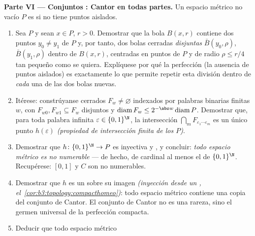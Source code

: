\begin{problem}
\medskip
\noindent\textbf{Parte VI --- Conjuntos
: Cantor en todas partes.} Un
espacio métrico  no vacío $P$
es \emph{} si no tiene puntos
aislados.
\begin{enumerate}[resume]
  \item Sea $P$ 
   y sean $x \in P$, $r > 0$.
  Demostrar que la bola $B(x, r)$ contiene dos puntos $y_0
        \neq y_1$ de $P$ y, por tanto, dos bolas cerradas
  \emph{disjuntas} $\bar B(y_0, \rho)$, $\bar B(y_1, \rho)$ dentro de
  $B(x, r)$, centradas en puntos de $P$ y de radio $\rho
        \leq r/4$ tan pequeño como se quiera. Explíquese por qué la
  perfección (la ausencia de puntos aislados) es exactamente lo que
  permite repetir esta división dentro de \emph{cada} una de las dos
  bolas nuevas. \item Itérese: constrúyanse cerrados
  $F_w \neq \varnothing$ indexados por palabras binarias finitas $w$,
  con $F_{w0},
        F_{w1} \subseteq F_w$ disjuntos y
  $\operatorname{diam}F_w \leq 2^{-\abs w}
        \operatorname{diam}P$. Demostrar que, para toda palabra infinita
  $\varepsilon \in \{0,1\}^\N$, la intersección
  $\bigcap_mF_{\varepsilon_1\cdots\varepsilon_m}$ es un único punto
  $h(\varepsilon)$ \emph{(propiedad de intersección finita de los
   $P$)}. \item Demostrar que
  $h\colon\{0,1\}^\N \to P$ es inyectiva y
  , y concluir: \emph{todo
  espacio métrico 
   es no numerable} --- de
  hecho, de cardinal al menos el de $\{0,1\}^\N$. Recupérese: $[0,1]$ y
  $C$ son no numerables. \item Demostrar que $h$ es un
   sobre su imagen
  \emph{(inyección  desde
  un ,
  el~\cref{cor:b3:topology:compacthomeo})}: todo espacio métrico
   contiene una copia
   del conjunto de
  Cantor. El conjunto de Cantor no es una rareza, sino el germen
  universal de la perfección compacta.
  \item Deducir que todo espacio métrico

\end{enumerate}
\end{problem}
